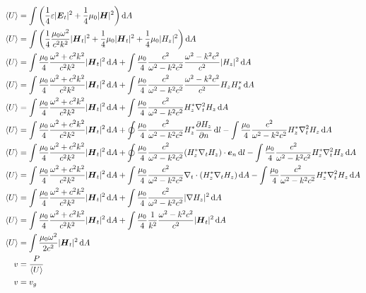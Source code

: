     \begin{align*}
    \langle U \rangle &= \int \left( \frac{1}{4} \varepsilon |\boldsymbol{E}_t|^2 + \frac{1}{4} \mu_0 |\boldsymbol{H}|^2 \right) \dif A\\
    \langle U \rangle &= \int \left( \frac{1}{4} \frac{\mu_0\omega^2}{c^2k^2} |\boldsymbol{H}_t|^2 
    + \frac{1}{4} \mu_0 |\boldsymbol{H}_t|^2
    + \frac{1}{4} \mu_0 |H_z|^2\right) \dif A\\
    \langle U \rangle &= \int  \frac{\mu_0}{4} \frac{\omega^2+c^2k^2}{c^2k^2} |\boldsymbol{H}_t|^2 \dif A
    + \int\frac{\mu_0}{4}\frac{c^2}{\omega^2-k^2c^2}\frac{\omega^2-k^2c^2}{c^2}  |H_z|^2 \dif A\\
        \langle U \rangle &= \int  \frac{\mu_0}{4} \frac{\omega^2+c^2k^2}{c^2k^2} |\boldsymbol{H}_t|^2 \dif A
    + \int\frac{\mu_0}{4}\frac{c^2}{\omega^2-k^2c^2}\frac{\omega^2-k^2c^2}{c^2}  H_zH_z^* \dif A\\
    \langle U \rangle &= \int  \frac{\mu_0}{4} \frac{\omega^2+c^2k^2}{c^2k^2} |\boldsymbol{H}_t|^2 \dif A
    + \int\frac{\mu_0}{4}\frac{c^2}{\omega^2-k^2c^2}H_z^* \nabla_t^2 H_z\dif A\\
    \langle U \rangle &= \int  \frac{\mu_0}{4} \frac{\omega^2+c^2k^2}{c^2k^2} |\boldsymbol{H}_t|^2 \dif A
    + \oint\frac{\mu_0}{4}\frac{c^2}{\omega^2-k^2c^2} H_z^* \frac{\partial H_z}{\partial n} \dif l
    - \int\frac{\mu_0}{4}\frac{c^2}{\omega^2-k^2c^2}H_z^* \nabla_t^2 H_z\dif A\\
    \langle U \rangle &= \int  \frac{\mu_0}{4} \frac{\omega^2+c^2k^2}{c^2k^2} |\boldsymbol{H}_t|^2 \dif A
    + \oint\frac{\mu_0}{4}\frac{c^2}{\omega^2-k^2c^2} (H_z^* \nabla_t H_z)\cdot\boldsymbol{e}_n \dif l
    - \int\frac{\mu_0}{4}\frac{c^2}{\omega^2-k^2c^2}H_z^* \nabla_t^2 H_z\dif A\\
    \langle U \rangle &= \int  \frac{\mu_0}{4} \frac{\omega^2+c^2k^2}{c^2k^2} |\boldsymbol{H}_t|^2 \dif A
    + \int\frac{\mu_0}{4}\frac{c^2}{\omega^2-k^2c^2}\nabla_t \cdot (H_z^* \nabla_t H_z) \dif A
    - \int\frac{\mu_0}{4}\frac{c^2}{\omega^2-k^2c^2}H_z^* \nabla_t^2 H_z\dif A\\
    \langle U \rangle &= \int  \frac{\mu_0}{4} \frac{\omega^2+c^2k^2}{c^2k^2} |\boldsymbol{H}_t|^2 \dif A
    + \int\frac{\mu_0}{4}\frac{c^2}{\omega^2-k^2c^2}|\nabla H_z|^2 \dif A\\
    \langle U \rangle &= \int  \frac{\mu_0}{4} \frac{\omega^2+c^2k^2}{c^2k^2} |\boldsymbol{H}_t|^2 \dif A
    + \int\frac{\mu_0}{4}\frac{1}{k^2}\frac{\omega^2-k^2c^2}{c^2}|\boldsymbol{H}_t|^2 \dif A\\
    \langle U \rangle &= \int  \frac{\mu_0\omega^2}{2c^2}|\boldsymbol{H}_t|^2 \dif A\\
    v&=\frac{P}{\langle U \rangle}\\
    v&=v_g
\end{align*}

